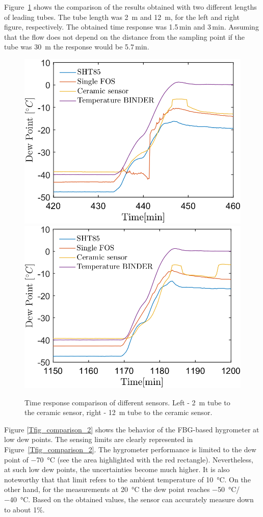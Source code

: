 Figure~\ref{fig_comparison_hw} shows the comparison of the results obtained with two different lengths of leading tubes. The tube length was \SI{2}{\metre} and \SI{12}{\metre}, for the left and right figure, respectively. The obtained time response was 1.5\,min and 3\,min. Assuming that the flow does not depend on the distance from the sampling point if the tube was \SI{30}{\metre} the response would be 5.7\,min. 
\begin{figure}[!h]
\centering
\includegraphics[width=0.47\columnwidth]{Chapter5/images/DPCPercent_response2m.png}
\includegraphics[width=0.47\columnwidth]{Chapter5/images/DPCPercent_response12m.png}
\caption{Time response comparison of different sensors. Left - \SI{2}{\metre} tube to the ceramic sensor, right - \SI{12}{\metre} tube to the ceramic sensor.}
\label{fig_comparison_hw}
\end{figure}
\newpage
Figure \ref{Tfig_comparison_2} shows the behavior of the \gls{FBG}-based hygrometer at low dew points. The sensing limits are clearly represented in Figure~\ref{Tfig_comparison_2}. The hygrometer performance is limited to the dew point of \SI{-70}{\celsius} (see the area highlighted with the red rectangle). Nevertheless, at such low dew points, the uncertainties become much higher. It is also noteworthy that that limit refers to the ambient temperature of \SI{10}{\celsius}. On the other hand, for the measurements at \SI{20}{\celsius} the dew point reaches \SI{-50}{\celsius}/\SI{-40}{\celsius}. Based on the obtained values, the sensor can accurately measure down to about 1\%. 

